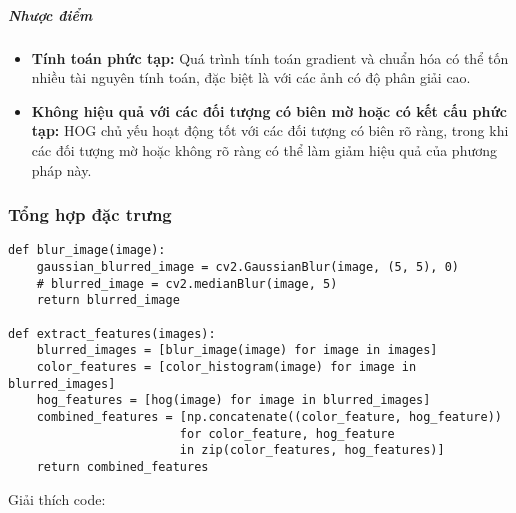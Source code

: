 \documentclass[a4paper,12pt]{article}
\begin{document}
\subparagraph{Nhược điểm}
\begin{itemize}
    \item \textbf{Tính toán phức tạp:} Quá trình tính toán gradient và chuẩn hóa có thể tốn nhiều tài nguyên tính toán, đặc biệt là với các ảnh có độ phân giải cao.
    \item \textbf{Không hiệu quả với các đối tượng có biên mờ hoặc có kết cấu phức tạp:} HOG chủ yếu hoạt động tốt với các đối tượng có biên rõ ràng, trong khi các đối tượng mờ hoặc không rõ ràng có thể làm giảm hiệu quả của phương pháp này.
\end{itemize}
\vspace{5mm}


\subsubsection{Tổng hợp đặc trưng}
\label{subsubsec:tong-hop-dac-trung}

\begin{verbatim}
def blur_image(image):
    gaussian_blurred_image = cv2.GaussianBlur(image, (5, 5), 0)
    # blurred_image = cv2.medianBlur(image, 5)
    return blurred_image

def extract_features(images):
    blurred_images = [blur_image(image) for image in images]
    color_features = [color_histogram(image) for image in blurred_images]
    hog_features = [hog(image) for image in blurred_images]
    combined_features = [np.concatenate((color_feature, hog_feature)) 
                        for color_feature, hog_feature 
                        in zip(color_features, hog_features)]
    return combined_features
\end{verbatim}

\noindent Giải thích code:
\end{document}
